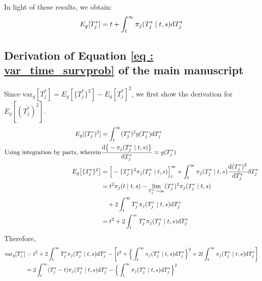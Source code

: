 In light of these results, we obtain:
\begin{equation*}
E_g[T^*_j] = t + \int_t^{\infty} \pi_j(T^*_j \mid t, s) \mathrm{d} T^*_j\\
\end{equation*}

\subsection{Derivation of Equation \ref{eq : var_time_survprob} of the main manuscript}
Since $\mbox{var}_g[T^*_j] = E_g[\{T^*_j\}^2] - E_g[T^*_j]^2$, we first show the derivation for $E_g[(T^*_j)^2]$.
\begin{equation*}
\begin{split}
E_g[(T^*_j)^2] &= \int_t^{\infty} (T^*_j)^2 g(T^*_j)\mathrm{d} T^*_j\\
\text{Using integration by parts, wherein} & \frac{\mathrm{d} \big\{-\pi_j(T^*_j \mid t, s)\big\}}{\mathrm{d} T^*_j} = g(T^*_j)\\
E_g\big[\{T^*_j\}^2\big] &= \Big[-\{T^*_j\}^2\pi_j(T^*_j \mid t, s)\Big]_t^\infty + \int_t^{\infty} \pi_j(T^*_j \mid t, s) \frac{\mathrm{d} (T^*_j)^2}{\mathrm{d} T^*_j} \mathrm{d} T^*_j\\
&= t^2 \pi_j(t \mid t, s) - \lim_{T^*_j\to \infty}(T^*_j)^2 \pi_j(T^*_j \mid t, s) \\& \quad + 2 \int_t^{\infty} T^*_j \pi_j(T^*_j \mid t, s) \mathrm{d} T^*_j\\
&= t^2 + 2 \int_t^{\infty} T^*_j \pi_j(T^*_j \mid t, s) \mathrm{d} T^*_j
\end{split}
\end{equation*}
Therefore,
\begin{equation*}
\begin{split}
\mbox{var}_g[T^*_j] &= t^2 + 2 \int_t^{\infty} T^*_j \pi_j(T^*_j \mid t, s) \mathrm{d} T^*_j - \bigg[t^2 +  \Big\{\int_t^\infty \pi_j(T^*_j \mid t, s) \mathrm{d} T^*_j \Big\}^2 + 2t\int_t^\infty \pi_j(T^*_j \mid t, s) \mathrm{d} T^*_j \bigg]\\
&=2 \int_t^{\infty} (T^*_j - t) \pi_j(T^*_j \mid t, s) \mathrm{d} T^*_j -  \Big\{\int_t^\infty \pi_j(T^*_j \mid t, s) \mathrm{d} T^*_j \Big\}^2
\end{split}
\end{equation*}
